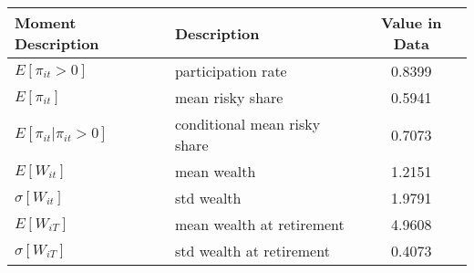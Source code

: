 \begin{tabular}{p{5cm}lS[table-format=1.4]}
        \toprule
        Moment Description & Description & {Value in Data} \\
        \midrule
        $E[\pi_{it} > 0]$ & participation rate & 0.8399 \\
        $E[\pi_{it}]$ & mean risky share & 0.5941 \\
        $E[\pi_{it}|\pi_{it} > 0]$ & conditional mean risky share & 0.7073 \\
        $E[W_{it}]$ & mean wealth & 1.2151 \\
        $\sigma[W_{it}]$ & std wealth & 1.9791 \\
        $E[W_{iT}]$ & mean wealth at retirement & 4.9608 \\
        $\sigma[W_{iT}]$ & std wealth at retirement & 0.4073 \\
        \bottomrule
    \end{tabular}